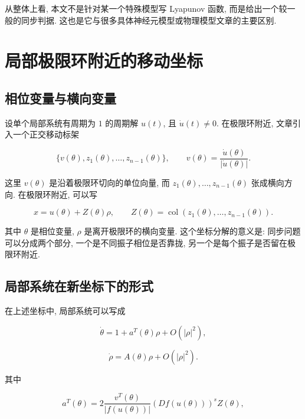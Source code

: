 \documentclass[oneside]{ctexart}
\begin{document}
从整体上看, 本文不是针对某一个特殊模型写 Lyapunov 函数, 而是给出一个较一般的同步判据. 这也是它与很多具体神经元模型或物理模型文章的主要区别.

\section{局部极限环附近的移动坐标}

\subsection{相位变量与横向变量}

设单个局部系统有周期为 $1$ 的周期解 $u(t)$, 且 $\dot{u}(t)\neq 0$. 在极限环附近, 文章引入一个正交移动标架

\begin{equation}
    \{v(\theta),z_1(\theta),\dots,z_{n-1}(\theta)\},
    \qquad
    v(\theta)=\dfrac{\dot{u}(\theta)}{|\dot{u}(\theta)|}.
\end{equation}

这里 $v(\theta)$ 是沿着极限环切向的单位向量, 而 $z_1(\theta),\dots,z_{n-1}(\theta)$ 张成横向方向. 在极限环附近, 可以写

\begin{equation}
    x=u(\theta)+Z(\theta)\rho,
    \qquad
    Z(\theta)=\operatorname{col}(z_1(\theta),\dots,z_{n-1}(\theta)).
\end{equation}

其中 $\theta$ 是相位变量, $\rho$ 是离开极限环的横向变量. 这个坐标分解的意义是: 同步问题可以分成两个部分, 一个是不同振子相位是否靠拢, 另一个是每个振子是否留在极限环附近.

\subsection{局部系统在新坐标下的形式}

在上述坐标中, 局部系统可以写成

\begin{equation}
    \dot{\theta}=1+a^T(\theta)\rho+O(|\rho|^2),
\end{equation}

\begin{equation}
    \dot{\rho}=A(\theta)\rho+O(|\rho|^2).
\end{equation}

其中

\begin{equation}
    a^T(\theta)=2\dfrac{v^T(\theta)}{|f(u(\theta))|}\left(Df(u(\theta))\right)^s Z(\theta),
\end{equation}
\end{document}
